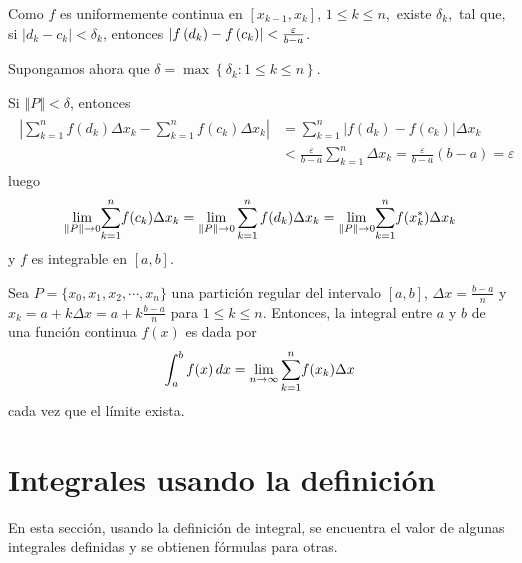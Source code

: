 \begin{parrafonumerado}
Como $f$ es uniformemente continua en $[x_{k-1},x_{k}]$, $1\leq
k\leq n$,\ existe $\delta _{k},$ tal que, si $\left\vert
d_{k}-c_{k}\right\vert <\delta _{k}$, entonces $\left\vert
f\left( d_{k}\right) -f\left( c_{k}\right) \right\vert <\frac{\varepsilon }{%
b-a}$.

Supongamos ahora que $\delta =\max\left\{ \delta _{k}:1\leq k\leq n\right\}$.

Si $\left\Vert P\right\Vert <\delta$, entonces
\begin{gather*}
\begin{aligned}
\left\vert \sum_{k=1}^{n}f(d_{k})\Delta x_{k}-%
\sum_{k=1}^{n}f(c_{k})\Delta x_{k}\right\vert &=%
\sum_{k=1}^{n}\left\vert
f(d_{k})-f(c_{k})\right\vert \Delta x_{k}\\
&<\frac{\varepsilon }{b-a}
\sum_{k=1}^{n}\Delta x_{k}%
=\frac{\varepsilon }{b-a}\left( b-a\right) =\varepsilon
\end{aligned}
\end{gather*}
luego
\[
\underset{\left\Vert P\right\Vert \rightarrow 0}{\lim }\overset{n}{\underset%
{k=1}{\sum }}f(c_{k})\Delta x_{k}=\underset{\left\Vert P\right\Vert
\rightarrow 0}{\lim }\sum_{k=1}^{n}f(d_{k})\Delta
x_{k}=\underset{\left\Vert P\right\Vert \rightarrow 0}{\lim }\overset{n}{%
\underset{k=1}{\sum }}f(x_{k}^{\ast })\Delta x_{k}
\]
y $f$ es integrable en $[a,b].$
\end{parrafonumerado}

\begin{defi}
Sea $P=\{x_{0},x_{1},x_{2},\cdots ,x_{n}\}$ una partición regular del
intervalo $[a,b]$, $\Delta x=\frac{b-a}{n}$ y $x_{k}=a+k\Delta x=a+k\frac{b-a}{n}$ para $1\leq k\leq n$. Entonces, la integral entre $a$ y $b$ de
una función continua $f(x)$ es dada por
\[
\int_{a}^{b}f(x)\,dx=\lim_{n\to\infty}\overset{n}{%
\underset{k=1}{\sum }}f(x_{k})\Delta x
\]
cada vez que el límite exista.
\end{defi}

\section{Integrales usando la definición}

En esta sección, usando la definición de integral, se encuentra el
valor de algunas integrales definidas y se obtienen fórmulas para
otras.

